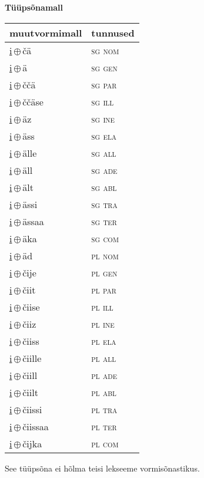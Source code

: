 

\vspace{3.5em}
\noindent \begin{minipage}{\textwidth}
\noindent \textbf{Tüüpsõnamall \,}\\

\begin{sideways}
\begin{tabular}{l l}
muutvormimall & tunnused \\
\hline
\underline{i}\,$\oplus$\,čä & \textsc{ sg nom } \\
\underline{i}\,$\oplus$\,ä & \textsc{ sg gen } \\
\underline{i}\,$\oplus$\,ččä & \textsc{ sg par } \\
\underline{i}\,$\oplus$\,ččäse & \textsc{ sg ill } \\
\underline{i}\,$\oplus$\,äz & \textsc{ sg ine } \\
\underline{i}\,$\oplus$\,äss & \textsc{ sg ela } \\
\underline{i}\,$\oplus$\,älle & \textsc{ sg all } \\
\underline{i}\,$\oplus$\,äll & \textsc{ sg ade } \\
\underline{i}\,$\oplus$\,ält & \textsc{ sg abl } \\
\underline{i}\,$\oplus$\,ässi & \textsc{ sg tra } \\
\underline{i}\,$\oplus$\,ässaa & \textsc{ sg ter } \\
\underline{i}\,$\oplus$\,äka & \textsc{ sg com } \\
\underline{i}\,$\oplus$\,äd & \textsc{ pl nom } \\
\underline{i}\,$\oplus$\,čije & \textsc{ pl gen } \\
\underline{i}\,$\oplus$\,čiit & \textsc{ pl par } \\
\underline{i}\,$\oplus$\,čiise & \textsc{ pl ill } \\
\underline{i}\,$\oplus$\,čiiz & \textsc{ pl ine } \\
\underline{i}\,$\oplus$\,čiiss & \textsc{ pl ela } \\
\underline{i}\,$\oplus$\,čiille & \textsc{ pl all } \\
\underline{i}\,$\oplus$\,čiill & \textsc{ pl ade } \\
\underline{i}\,$\oplus$\,čiilt & \textsc{ pl abl } \\
\underline{i}\,$\oplus$\,čiissi & \textsc{ pl tra } \\
\underline{i}\,$\oplus$\,čiissaa & \textsc{ pl ter } \\
\underline{i}\,$\oplus$\,čijka & \textsc{ pl com } \\
\end{tabular}
\end{sideways}
\label{tab:tüüpsõnamall-ičä}

\end{minipage}

 
\vspace{1em}
\noindent See tüüpsõna ei hõlma teisi lekseeme vormi\-sõnastikus.
